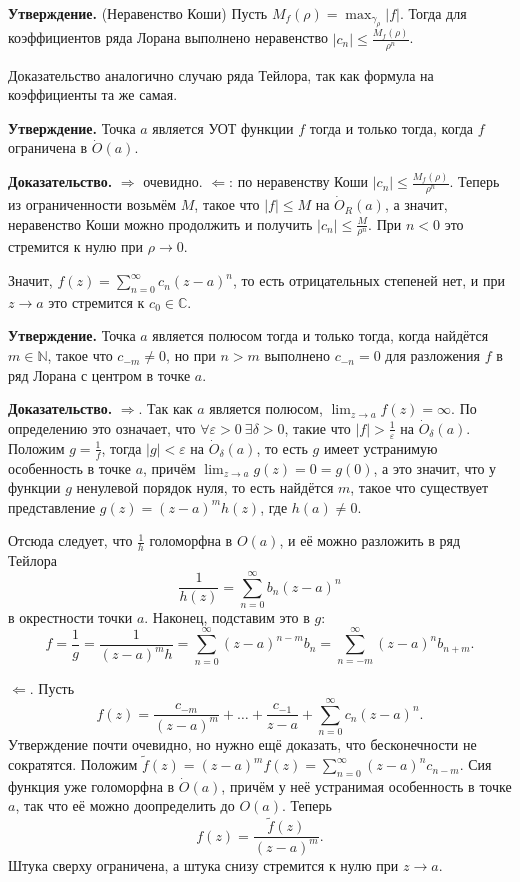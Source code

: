 \textbf{Утверждение.} (Неравенство Коши) Пусть $M_f(\rho) = \max_{\gamma_\rho} |f|$.
Тогда для коэффициентов ряда Лорана выполнено неравенство $|c_n| \le \frac{M_f(\rho)}{\rho^n}$.

Доказательство аналогично случаю ряда Тейлора, так как формула на коэффициенты та же самая.

\textbf{Утверждение.} Точка $a$ является УОТ функции $f$ тогда и только тогда, когда $f$ ограничена в $\dot O(a)$.

\textbf{Доказательство.} $\Rightarrow$ очевидно. $\Leftarrow$: по неравенству Коши $|c_n| \le \frac{M_f(\rho)}{\rho^n}$.
Теперь из ограниченности возьмём $M$, такое что $|f| \le M$ на $\dot O_R(a)$, а значит, неравенство Коши можно продолжить и получить $|c_n| \le \frac{M}{\rho^n}$.
При $n < 0$ это стремится к нулю при $\rho \to 0$.

Значит, $f(z) = \sum_{n=0}^{\infty} c_n (z - a)^n$, то есть отрицательных степеней нет, и при $z \to a$ это стремится к $c_0 \in \mathbb C$.

\QED

\textbf{Утверждение.} Точка $a$ является полюсом тогда и только тогда, когда найдётся $m \in \mathbb N$, такое что $c_{-m} \ne 0$, но при $n > m$ выполнено $c_{-n} = 0$ для разложения $f$ в ряд Лорана с центром в точке $a$.

\textbf{Доказательство.} $\Rightarrow$. Так как $a$ является полюсом, $\lim_{z \to a} f(z) = \infty$.
По определению это означает, что $\forall \varepsilon > 0~\exists \delta > 0$, такие что $|f| > \frac{1}{\varepsilon}$ на $\dot O_\delta(a)$.
Положим $g = \frac{1}{f}$, тогда $|g| < \varepsilon$ на $\dot O_\delta(a)$, то есть $g$ имеет устранимую особенность в точке $a$, причём $\lim_{z \to a} g(z) = 0 = g(0)$, а это значит, что у функции $g$ ненулевой порядок нуля, то есть найдётся $m$, такое что существует представление $g(z) = (z - a)^m h(z)$, где $h(a) \ne 0$.

Отсюда следует, что $\frac{1}{h}$ голоморфна в $O(a)$, и её можно разложить в ряд Тейлора
\[
    \frac{1}{h(z)} = \sum_{n=0}^{\infty} b_n (z - a)^n
\]
в окрестности точки $a$.
Наконец, подставим это в $g$:
\[
    f = \frac{1}{g} = \frac{1}{(z - a)^m h} = \sum_{n=0}^{\infty} (z - a)^{n-m} b_n = \sum_{n=-m}^{\infty} (z - a)^n b_{n+m}.
\]

$\Leftarrow$. Пусть
\[
    f(z) = \frac{c_{-m}}{(z - a)^m} + \dots + \frac{c_{-1}}{z - a} + \sum_{n=0}^{\infty} c_n (z - a)^n.
\]
Утверждение почти очевидно, но нужно ещё доказать, что бесконечности не сократятся.
Положим $\tilde f(z) = (z - a)^m f(z) = \sum_{n=0}^{\infty} (z - a)^n c_{n-m}$.
Сия функция уже голоморфна в $\dot O(a)$, причём у неё устранимая особенность в точке $a$, так что её можно доопределить до $O(a)$.
Теперь
\[
    f(z) = \frac{\tilde f(z)}{(z - a)^m}.
\]
Штука сверху ограничена, а штука снизу стремится к нулю при $z \to a$.

